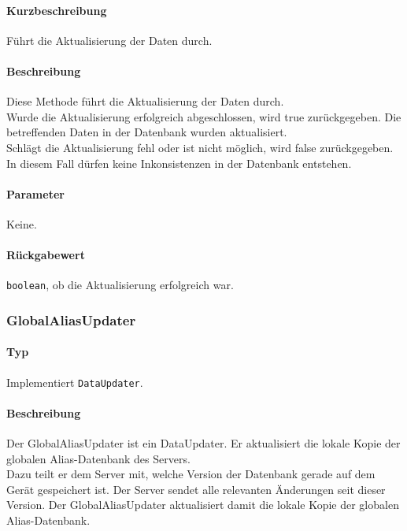 \paragraph*{Kurzbeschreibung}
Führt die Aktualisierung der Daten durch.
\paragraph*{Beschreibung}
Diese Methode führt die Aktualisierung der Daten durch.\\
Wurde die Aktualisierung erfolgreich abgeschlossen, wird true zurückgegeben. 
Die betreffenden Daten in der Datenbank wurden aktualisiert.\\
Schlägt die Aktualisierung fehl oder ist nicht möglich, wird false zurückgegeben.
In diesem Fall dürfen keine Inkonsistenzen in der Datenbank entstehen.
\paragraph*{Parameter}
Keine.
\paragraph*{Rückgabewert}
\texttt{boolean}, ob die Aktualisierung erfolgreich war.

\subsubsection{GlobalAliasUpdater}
\paragraph*{Typ}
Implementiert \texttt{DataUpdater}.
\paragraph*{Beschreibung}
Der GlobalAliasUpdater ist ein DataUpdater. Er aktualisiert die lokale Kopie der globalen
Alias-Datenbank des Servers. \\
Dazu teilt er dem Server mit, welche Version der Datenbank gerade auf dem Gerät 
gespeichert ist. Der Server sendet alle relevanten Änderungen seit dieser Version. 
Der GlobalAliasUpdater aktualisiert damit die lokale Kopie der globalen Alias-Datenbank.